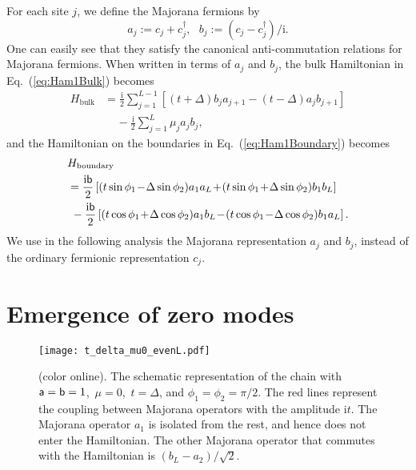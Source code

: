 \documentclass[aps, prb, showpacs, twocolumn, %
amssymb,superscriptaddress]{revtex4}
\def\dag{\dagger}
\newcommand{\ii}{\text{i}}
\begin{document}
For each site $j$, we define the Majorana fermions by
\begin{equation}
a_{j} := c_{j} + c^{\dag}_{j},~~~b_{j} := (c_{j} - c^{\dag}_{j})/\ii.
\end{equation}
One can easily see that they satisfy the canonical anti-commutation relations for Majorana fermions. When written in terms of $a_{j}$ and $b_{j}$, the bulk Hamiltonian in Eq.~(\ref{eq:Ham1Bulk}) becomes
\begin{align}
H_{\mathrm{bulk}} &= \frac{\ii}{2} \sum^{L-1}_{j=1}
      \left[ (t+\Delta) b_{j} a_{j+1} - (t-\Delta) a_{j} b_{j+1} \right]
\nonumber \\
	&~~~~~- \frac{\ii}{2} \sum^L_{j=1} \mu_{j} a_{j} b_{j},
      \label{eq:Majo HamBulk}
\end{align}
and the Hamiltonian on the boundaries in Eq.~(\ref{eq:Ham1Boundary}) becomes
\begin{align}
&H_{\mathrm{boundary}}
\nonumber \\
&= \frac{\ii {\sf b}}{2} \left[ ( t \sin \phi_{1} \!-\! \Delta \sin \phi_{2} ) a_{1} a_{L}
\!+\! ( t \sin \phi_{1} \!+\! \Delta \sin \phi_{2} ) b_{1} b_{L} \right]
\nonumber \\
&~ - \frac{\ii {\sf b}}{2} \left[ ( t \cos \phi_{1} \!+\! \Delta \cos \phi_{2} ) a_{1} b_{L}
\!-\! ( t \cos \phi_{1} \!-\! \Delta \cos \phi_{2} ) b_{1} a_{L} \right].
      \label{eq:Majo HamBoundary}
\end{align}
We use in the following analysis the Majorana representation $a_{j}$ and $b_{j}$, instead of the ordinary fermionic representation $c_{j}$.



\section{Emergence of zero modes}
\label{sec:emergence of zero modes}

\begin{figure}[t]
\centering
\texttt{[image: t\_delta\_mu0\_evenL.pdf]}
\caption{(color online). 
The schematic representation of the chain with ${\sf a}={\sf b}=1$,~$\mu=0$,~$t=\Delta$, and $\phi_{1} = \phi_{2} = \pi/2$. The red lines represent the coupling between Majorana operators with the amplitude $\ii t$. The Majorana operator $a_1$ is isolated from the rest, and hence does not enter the Hamiltonian. The other Majorana operator that commutes with the Hamiltonian is $\left( b_{L} - a_{2} \right) /\sqrt{2}$.}
\label{fig:t=delta+mu0}
\end{figure}
\end{document}
